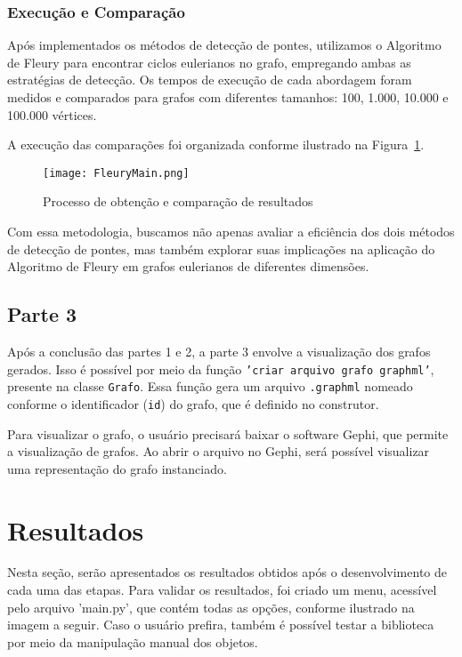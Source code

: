 \documentclass[12pt]{article}
\begin{document}
\subsubsection{Execução e Comparação}
Após implementados os métodos de detecção de pontes, utilizamos o Algoritmo de Fleury para encontrar ciclos eulerianos no grafo, empregando ambas as estratégias de detecção. Os tempos de execução de cada abordagem foram medidos e comparados para grafos com diferentes tamanhos: 100, 1.000, 10.000 e 100.000 vértices.

A execução das comparações foi organizada conforme ilustrado na Figura~\ref{fig:obtencaoResultados}.

\begin{figure}[ht]
\centering
\texttt{[image: FleuryMain.png]}
\caption{Processo de obtenção e comparação de resultados}
\label{fig:obtencaoResultados}
\end{figure}

Com essa metodologia, buscamos não apenas avaliar a eficiência dos dois métodos de detecção de pontes, mas também explorar suas implicações na aplicação do Algoritmo de Fleury em grafos eulerianos de diferentes dimensões.


\subsection{Parte 3}

Após a conclusão das partes 1 e 2, a parte 3 envolve a visualização dos grafos gerados. Isso é possível por meio da função \texttt{'criar arquivo grafo graphml'}, presente na classe \texttt{Grafo}. Essa função gera um arquivo \texttt{.graphml} nomeado conforme o identificador (\texttt{id}) do grafo, que é definido no construtor.

Para visualizar o grafo, o usuário precisará baixar o software Gephi, que permite a visualização de grafos. Ao abrir o arquivo no Gephi, será possível visualizar uma representação do grafo instanciado.

\section{Resultados}

Nesta seção, serão apresentados os resultados obtidos após o desenvolvimento de cada uma das etapas. Para validar os resultados, foi criado um menu, acessível pelo arquivo 'main.py', que contém todas as opções, conforme ilustrado na imagem a seguir. Caso o usuário prefira, também é possível testar a biblioteca por meio da manipulação manual dos objetos.
\end{document}
